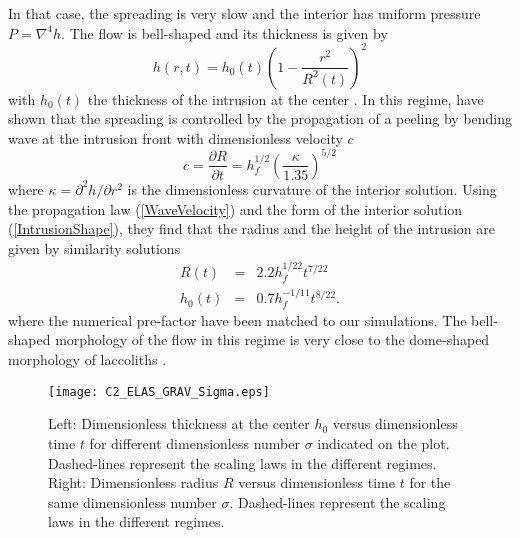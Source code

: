 In that case, the spreading is  very slow and the interior has uniform
pressure $P =\nabla^4h$.  The flow is bell-shaped and its thickness is
given by
\begin{equation}
  h(r,t) = h_0(t)\left(1-\frac{r^2}{R^2(t)}\right)^2
  \label{IntrusionShape}
\end{equation}
with  $h_0(t)$   the  thickness  of   the  intrusion  at   the  center
\citep{Michaut:2011kg,Lister:2013ia}.       In       this      regime,
\citet{Lister:2013ia} have  shown that the spreading  is controlled by
the propagation  of a peeling by  bending wave at the  intrusion front
with dimensionless velocity $c$
\begin{equation}
  c=    \frac{\partial             R}{\partial            t}             =h_f^{1/2}
  \left(\frac{\kappa}{1.35}\right)^{5/2}
  \label{WaveVelocity}
\end{equation}
where  $\kappa  =  \partial^2  h/\partial r^2$  is  the  dimensionless
curvature  of  the  interior  solution.   Using  the  propagation  law
(\ref{WaveVelocity})   and  the   form   of   the  interior   solution
(\ref{IntrusionShape}), they  find that the  radius and the  height of
the intrusion are given by similarity solutions
\begin{eqnarray}
  R(t) &=& 2.2h_f^{1/22}t^{7/22}\label{ScalingR}\\
  h_0(t)&=&0.7 h_f^{-1/11}t^{8/22}\label{ScalingH}.
\end{eqnarray}
where   the   numerical   pre-factor   have  been   matched   to   our
simulations. The bell-shaped morphology of  the flow in this regime is
very   close    to   the   dome-shaped   morphology    of   laccoliths
\citep{Michaut:2011kg}.

\begin{figure}
  \begin{center}
    \graphicspath{ {/Users/thorey/Documents/These/Manuscript/Figure/Chapter2/} }
    \texttt{[image: C2\_ELAS\_GRAV\_Sigma.eps]}
    \caption{Left: Dimensionless thickness at  the center $h_0$ versus
      dimensionless  time  $t$   for  different  dimensionless  number
      $\sigma$  indicated on  the  plot.   Dashed-lines represent  the
      scaling  laws in  the different  regimes.  Right:  Dimensionless
      radius  $R$   versus  dimensionless   time  $t$  for   the  same
      dimensionless  number  $\sigma$.    Dashed-lines  represent  the
      scaling laws in the different regimes.}
    \label{C2_ELAS_GRAV_Sigma}
  \end{center}
\end{figure}

